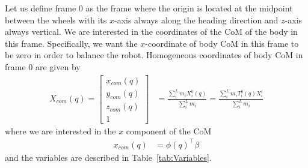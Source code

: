 \documentclass[letterpaper, 10 pt, conference]{ieeeconf}
\makeatletter
\newenvironment{conditions}
  {\par\vspace{\abovedisplayskip}\noindent\begin{tabular}{>{$}l<{$} @{${}={}$}
  l}}
  {\end{tabular}\par\vspace{\belowdisplayskip}}
\makeatother
\begin{document}
Let us define frame $0$ as the frame where the origin  is located at the
midpoint between the wheels with its $x$-axis always along the heading direction
and $z$-axis always vertical. We are interested in the coordinates of the
\ac{CoM} of the body in this frame. Specifically, we want the $x$-coordinate of
body \ac{CoM} in this frame to be zero in order to balance the robot.
Homogeneous coordinates of body CoM in frame $0$ are given by
\begin{align}
    X_{com}(q) \!= \!\begin{bmatrix} x_{com}(q) \\ y_{com}(q) \\ z_{com}(q) \\
    1 \end{bmatrix} &\!= \! \frac{\sum_{i}^{L} m_i X_i^0(q)}{\sum_{i}^{L} m_i}
    \!= \! \frac{\sum_{i}^{L} m_i {T}_{i}^{0}(q)X_i^i}{\sum_{i}^{L} m_i}
    \nonumber
\end{align}
where we are interested in the $x$ component of the CoM
\begin{align}
    x_{com}(q) &= \phi(q)^\top \beta \label{eq:xcom}
\end{align}
and the variables are described in Table~\ref{tab:Variables}.
\end{document}
